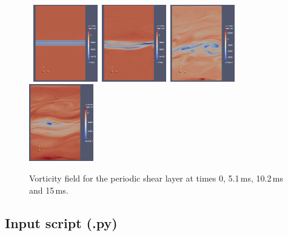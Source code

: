\begin{figure}[htbp]
\begin{center}
\mbox{
\includegraphics[width=0.25\textwidth]{../2D/periodic-shear-layer/psl-vorticity-t00.png}
\includegraphics[width=0.25\textwidth]{../2D/periodic-shear-layer/psl-vorticity-t05.png}
\includegraphics[width=0.25\textwidth]{../2D/periodic-shear-layer/psl-vorticity-t10.png}
\includegraphics[width=0.25\textwidth]{../2D/periodic-shear-layer/psl-vorticity-t15.png}
}
\end{center}
\caption{Vorticity field for the periodic shear layer at times 0, 5.1\,ms, 10.2\,ms and 15\,ms.}
\label{psl-vorticity-fig}
\end{figure}

\newpage

\subsection{Input script (.py)}
\label{psl-py-file}
\topbar

\bottombar


